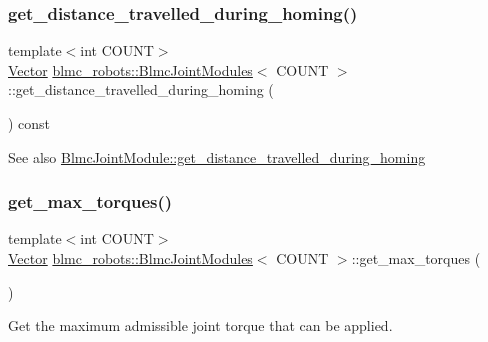 \subsubsection{\texorpdfstring{get\+\_\+distance\+\_\+travelled\+\_\+during\+\_\+homing()}{get\_distance\_travelled\_during\_homing()}}
{\footnotesize\ttfamily template$<$int C\+O\+U\+NT$>$ \\
\hyperlink{classblmc__robots_1_1BlmcJointModules_abaff382c6fd4b494ec0c17498d94919e}{Vector} \hyperlink{classblmc__robots_1_1BlmcJointModules}{blmc\+\_\+robots\+::\+Blmc\+Joint\+Modules}$<$ C\+O\+U\+NT $>$\+::get\+\_\+distance\+\_\+travelled\+\_\+during\+\_\+homing (\begin{DoxyParamCaption}{ }\end{DoxyParamCaption}) const\hspace{0.3cm}{\ttfamily [inline]}}

\begin{DoxySeeAlso}{See also}
\hyperlink{classblmc__robots_1_1BlmcJointModule_a9fd53d7e340b4067f3505633e5a8a06d}{Blmc\+Joint\+Module\+::get\+\_\+distance\+\_\+travelled\+\_\+during\+\_\+homing} 
\end{DoxySeeAlso}
\mbox{\label{classblmc__robots_1_1BlmcJointModules_a6cc2989e6132988557ebe03e69658f50}} 
\subsubsection{\texorpdfstring{get\+\_\+max\+\_\+torques()}{get\_max\_torques()}}
{\footnotesize\ttfamily template$<$int C\+O\+U\+NT$>$ \\
\hyperlink{classblmc__robots_1_1BlmcJointModules_abaff382c6fd4b494ec0c17498d94919e}{Vector} \hyperlink{classblmc__robots_1_1BlmcJointModules}{blmc\+\_\+robots\+::\+Blmc\+Joint\+Modules}$<$ C\+O\+U\+NT $>$\+::get\+\_\+max\+\_\+torques (\begin{DoxyParamCaption}{ }\end{DoxyParamCaption})\hspace{0.3cm}{\ttfamily [inline]}}



Get the maximum admissible joint torque that can be applied. 

